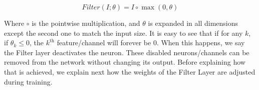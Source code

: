 \documentclass[sigconf]{acmart}
\newcommand{\srm}[1]{\textcolor{red}{{\bf Sam:} #1}}
\newcommand{\gl}[1]{\textcolor{violet}{{\bf Gl:} #1}}
\begin{document}
\begin{equation} Filter(I;\theta) = I \circ \max(0, \theta) \end{equation}

Where $\circ$ is the 
pointwise multiplication,
and $\theta$ is expanded in all
dimensions except the second one to match the input size. It is easy to see
that if for any $k$, if $\theta_k \leq 0$, the $k^{\text{th}}$ feature/channel
will forever be $0$. When this happens, we say the Filter layer deactivates the
neuron. These disabled neurons/channels can be removed from the network without
changing its output. Before explaining how that is achieved, we 
explain
next how the weights of the Filter Layer are adjusted during training.



%
%
%
\end{document}
